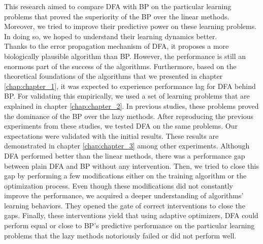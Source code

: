 \documentclass[a4paper, nobind]{templates/ociamthesis}
\begin{document}
This research aimed to compare DFA with BP on the particular learning problems that proved the superiority of the BP over the linear methods. Moreover, we tried to improve their predictive power on these learning problems. In doing so, we hoped to understand their learning dynamics better.\\
Thanks to the error propagation mechanism of DFA, it proposes a more biologically plausible algorithm than BP. However, the performance is still an enormous part of the success of the algorithms. Furthermore, based on the theoretical foundations of the algorithms that we presented in chapter \ref{chap:chapter_1}, it was expected to experience performance lag for DFA behind BP. For validating this empirically, we used a set of learning problems that are explained in chapter \ref{chap:chapter_2}. In previous studies, these problems proved the dominance of the BP over the lazy methods. After reproducing the previous experiments from these studies, we tested DFA on the same problems. Our expectations were validated with the initial results. These results are demonstrated in chapter \ref{chap:chapter_3} among other experiments. Although DFA performed better than the linear methods, there was a performance gap between plain DFA and BP without any intervention. Then, we tried to close this gap by performing a few modifications either on the training algorithm or the optimization process. Even though these modifications did not constantly improve the performance, we acquired a deeper understanding of algorithms' learning behaviors. They opened the gate of correct interventions to close the gaps. Finally, these interventions yield that using adaptive optimizers, DFA could perform equal or close to BP's predictive performance on the particular learning problems that the lazy methods notoriously failed or did not perform well.\\
\end{document}
